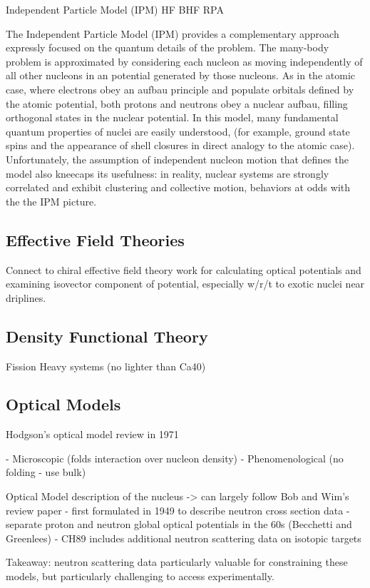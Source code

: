 Independent Particle Model (IPM)
HF
BHF
RPA

The Independent Particle Model (IPM) provides a complementary approach expressly
focused on the quantum details of the problem. The many-body problem is
approximated by considering each nucleon as moving independently of all other
nucleons in an potential generated by those nucleons. As in the atomic case,
where electrons obey an aufbau principle and populate orbitals defined by the
atomic potential, both protons and neutrons obey a nuclear aufbau, filling
orthogonal states in the nuclear potential. In this model, many fundamental
quantum properties of nuclei are easily understood, (for example, ground state spins and
the appearance of shell closures in direct analogy to the atomic case).
Unfortunately, the assumption of independent nucleon motion that defines the model
also kneecaps its usefulness: in reality, nuclear systems are strongly
correlated and exhibit clustering and collective motion, behaviors at odds with the
the IPM picture.

\subsection{Effective Field Theories}
Connect to chiral effective field theory work for calculating optical potentials
and examining isovector component of potential, especially w/r/t to exotic
nuclei near driplines.

\subsection{Density Functional Theory}
Fission
Heavy systems (no lighter than Ca40)

\subsection{Optical Models}
Hodgson's optical model review in 1971

- Microscopic (folds interaction over nucleon density)
- Phenomenological (no folding - use bulk)

Optical Model description of the nucleus
-> can largely follow Bob and Wim's review paper
- first formulated in 1949 to describe neutron cross section data
- separate proton and neutron global optical potentials in the 60s (Becchetti
and Greenlees)
- CH89 includes additional neutron scattering data on isotopic targets

Takeaway: neutron scattering data particularly valuable for constraining these
models, but particularly challenging to access experimentally.

